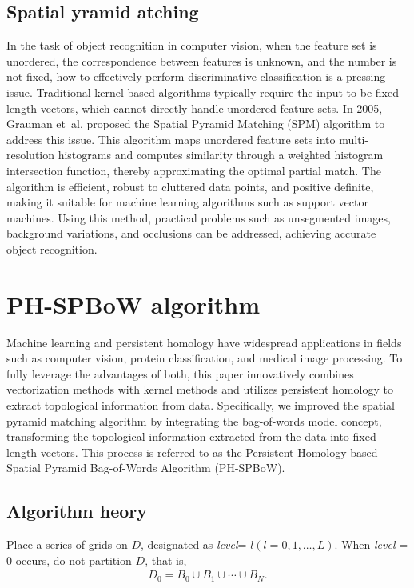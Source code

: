 \documentclass[5GeSdc,ASOC,numref,printGA,printHL,CASflow,nocrossmark,longtitle,PROOF]{/usr/local/texlive/iTemplates/01-Templates/01-Els-Jnl/01-Standard_Templates/V1/ELS_MDL5-V1-6}
\begin{document}
\begin{articlestyle}
\subsection{Spatial yramid atching}\label{sec2.4}

In the task of object recognition in computer vision, when the feature set is unordered, the correspondence between features is unknown, and the number is not fixed, how to effectively perform discriminative classification is a pressing issue. Traditional kernel-based algorithms typically require the input to be fixed-length vectors, which cannot directly handle unordered feature sets. In 2005, Grauman et~al. \cite{grauman2005pyramid} proposed the Spatial Pyramid Matching (SPM) algorithm to address this issue. This algorithm maps unordered feature sets into multi-resolution histograms and computes similarity through a weighted histogram intersection function, thereby approximating the optimal partial match. The algorithm is efficient, robust to cluttered data points, and positive definite, making it suitable for machine learning algorithms such as support vector machines. Using this method, practical problems such as \nobreak{}unsegmented images, background variations, and occlusions can be addressed, achieving accurate object recognition.

\section{PH-SPBoW algorithm}\label{sec3}

Machine learning and persistent homology have widespread applications in fields such as computer vision, protein classification, and medical image processing. To fully leverage the advantages of both, this paper innovatively combines vectorization methods with kernel methods and utilizes persistent homology to extract topological information from data. Specifically, we {improved} the spatial pyramid matching algorithm by integrating the bag-of-words model concept, transforming the topological information extracted from the data into fixed-length vectors. This process is referred to as the Persistent Homology-based Spatial Pyramid Bag-of-Words Algorithm (PH-SPBoW).

\subsection{Algorithm heory}\label{sec3.1}

Place a series of grids on $ D $, designated as \textit{level}= $ l (l = 0, 1, \ldots, L) $. When \textit{level} = 0 occurs, do not partition $ D $, that is,  
\begin{align*}  
D_0 = B_0 \cup B_1 \cup \cdots \cup B_N.  
\end{align*}  


\end{articlestyle}
\end{document}
